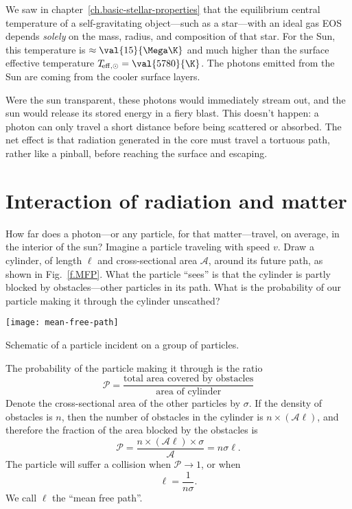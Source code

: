 
We saw in chapter~\ref{ch.basic-stellar-properties} that the equilibrium central temperature of a self-gravitating object---such as a star---with an ideal gas EOS depends \emph{solely} on the mass, radius, and composition of that star. For the Sun, this temperature is $\approx \val{15}{\Mega\K}$ and much higher than the surface effective temperature $T_{\!\mathrm{eff,\odot}} = \val{5780}{\K}$. The photons emitted from the Sun are coming from the cooler surface layers.

  Were the sun transparent, these photons would immediately stream out, and the sun would release its stored energy in a fiery blast.  This doesn't happen: a photon can only travel a short distance before being scattered or absorbed. The net effect is that radiation generated in the core must travel a tortuous path, rather like a pinball, before reaching the surface and escaping.

\section{Interaction of radiation and matter}\label{s.interaction-radiation-matter}

How far does a photon---or any particle, for that matter---travel, on average, in the interior of the sun? Imagine a particle traveling with speed $v$.  Draw a cylinder, of length $\ell$ and cross-sectional area $\mathcal{A}$, around its future path, as shown in Fig.~\ref{f.MFP}. What the particle ``sees'' is that the cylinder is partly blocked by obstacles---other particles in its path. What is the probability of our particle making it through the cylinder unscathed?

\begin{marginfigure}
    \texttt{[image: mean-free-path]}
    \caption{\label{f.MFP} Schematic of a particle incident on a group of particles.}
\end{marginfigure}

The probability of the particle making it through is the ratio
\[
    \mathcal{P} = \frac{\textrm{total area covered by obstacles}}{\textrm{area of cylinder}}
\]
Denote the cross-sectional area of the other particles by $\sigma$.  If the density of obstacles is $n$, then the number of obstacles in the cylinder is $n\times(\mathcal{A}\ell)$, and therefore the fraction of the area blocked by the obstacles is
\begin{equation}
    \mathcal{P} = \frac{n\times(\mathcal{A}\ell)\times\sigma}{\mathcal{A}} = n\sigma\ell.
\label{e.prob-MFP}
\end{equation}
The particle will suffer a collision when $\mathcal{P}\to 1$, or when
\begin{equation}\label{e.MFP}
    \ell = \frac{1}{n\sigma}.
\end{equation}
We call $\ell$ the ``mean free path''.

